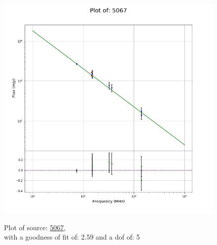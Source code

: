 \documentclass{article}
\begin{document}
\begin{figure}[H]
\begin{minipage}{0.5\textwidth}
        \includegraphics[scale = 0.35]{KmeulenSimSource_1hr/1hr5067.png}
        \captionsetup{labelformat=empty}
        \caption{Plot of source: \href{http://banana.transientskp.org/r4/vlo_KmeulenSimSource/runningcatalog/5067}{5067},\\with a goodness of fit of: 2.59 and a dof of: 5}
    \addtocounter{figure}{-1}
    \label{KmeulenSimSource:1hr:5067:plot}
    \end{minipage}
\end{figure}
\end{document}

